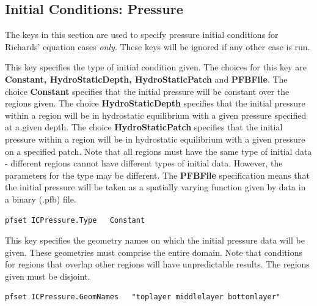 
\subsection{Initial Conditions: Pressure}
\label{Initial Conditions: Pressure}

The keys in this section are used to specify pressure initial conditions for
Richards' equation cases {\em only}.  These keys will be ignored if any other
case is run.

{This key specifies the type of initial condition given.  The choices for this
key are {\bf Constant, HydroStaticDepth, HydroStaticPatch} and {\bf PFBFile}.
The choice {\bf Constant} specifies that the initial pressure will be constant
over the regions given.  The choice {\bf HydroStaticDepth} specifies that the
initial pressure within a region
will be in hydrostatic equilibrium with a given pressure
specified at a given depth.  The choice {\bf HydroStaticPatch} specifies that
the initial pressure within a region
will be in hydrostatic equilibrium with a given pressure on a specified patch.
Note that all regions must have the same type of initial data - different
regions cannot have different types of initial data.  However, the parameters
for the type may be different.
The {\bf PFBFile} specification means that the initial pressure
will be taken as a spatially varying function given by data in a
\parflow{} binary (.pfb) file.
}
\begin{display}\begin{verbatim}
pfset ICPressure.Type   Constant
\end{verbatim}\end{display}

{This key specifies the geometry names on which the initial pressure data will
be given.  These geometries must comprise the entire domain.
Note that conditions for regions that overlap other regions will have
unpredictable results.  The regions given must be disjoint.
}
\begin{display}\begin{verbatim}
pfset ICPressure.GeomNames   "toplayer middlelayer bottomlayer"
\end{verbatim}\end{display}

